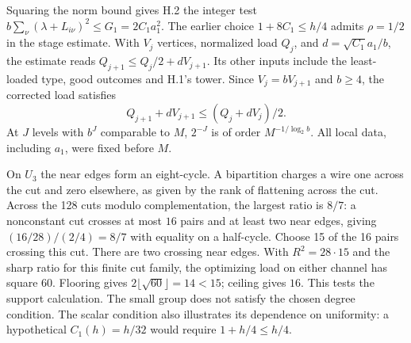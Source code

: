 Squaring the norm bound gives H.2 the integer test $b\sum_\nu(\lambda+L_{i\nu})^2\le G_1=2C_1a_1^2$. The earlier choice $1+8C_1\le h/4$ admits $\rho=1/2$ in the stage estimate. With $V_j$ vertices, normalized load $Q_j$, and $d=\sqrt{C_1}a_1/b$, the estimate reads $Q_{j+1}\le Q_j/2+dV_{j+1}$. Its other inputs include the least-loaded type, good outcomes and H.1's tower. Since $V_j=bV_{j+1}$ and $b\ge4$, the corrected load satisfies
\[
       Q_{j+1}+dV_{j+1}\le (Q_j+dV_j)/2 .
\]
At $J$ levels with $b^J$ comparable to $M$, $2^{-J}$ is of order $M^{-1/\log_2 b}$. All local data, including $a_1$, were fixed before $M$.

On $U_3$ the near edges form an eight-cycle. A bipartition charges a wire one across the cut and zero elsewhere, as given by the rank of flattening across the cut. Across the 128 cuts modulo complementation, the largest ratio is $8/7$: a nonconstant cut crosses at most $16$ pairs and at least two near edges, giving $(16/28)/(2/4)=8/7$ with equality on a half-cycle. Choose 15 of the 16 pairs crossing this cut. There are two crossing near edges. With $R^2=28\cdot15$ and the sharp ratio for this finite cut family, the optimizing load on either channel has square $60$. Flooring gives $2\lfloor\sqrt{60}\rfloor=14<15$; ceiling gives $16$. This tests the support calculation. The small group does not satisfy the chosen degree condition. The scalar condition also illustrates its dependence on uniformity: a hypothetical $C_1(h)=h/32$ would require $1+h/4\le h/4$.

